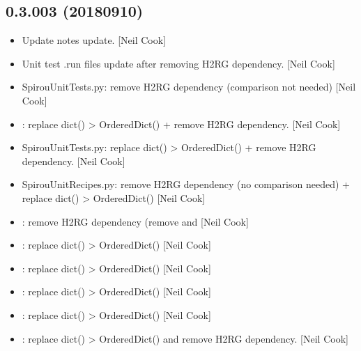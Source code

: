 \documentclass[a4paper,10pt,english]{report}
\begin{document}
\subsection{0.3.003 (2018\sphinxhyphen{}09\sphinxhyphen{}10)}
\label{\detokenize{misc/changelog:id351}}\begin{itemize}
\item {} 
Update notes \sphinxhyphen{} update. {[}Neil Cook{]}

\item {} 
Unit test .run files \sphinxhyphen{} update after removing H2RG dependency. {[}Neil
Cook{]}

\item {} 
SpirouUnitTests.py: remove H2RG dependency (comparison not needed)
{[}Neil Cook{]}

\item {} 
: replace dict() \textendash{}\textgreater{} OrderedDict() + remove H2RG
dependency. {[}Neil Cook{]}

\item {} 
SpirouUnitTests.py: replace dict() \textendash{}\textgreater{} OrderedDict() + remove H2RG
dependency. {[}Neil Cook{]}

\item {} 
SpirouUnitRecipes.py: remove H2RG dependency (no comparison needed) +
replace dict() \textendash{}\textgreater{} OrderedDict() {[}Neil Cook{]}

\item {} 
: remove H2RG dependency (remove 
and  {[}Neil Cook{]}

\item {} 
: replace dict() \textendash{}\textgreater{} OrderedDict() {[}Neil Cook{]}

\item {} 
: replace dict() \textendash{}\textgreater{} OrderedDict() {[}Neil Cook{]}

\item {} 
: replace dict() \textendash{}\textgreater{} OrderedDict() {[}Neil Cook{]}

\item {} 
: replace dict() \textendash{}\textgreater{} OrderedDict() {[}Neil Cook{]}

\item {} 
: replace dict() \textendash{}\textgreater{} OrderedDict() and remove H2RG
dependency. {[}Neil Cook{]}


\end{itemize}
\end{document}
